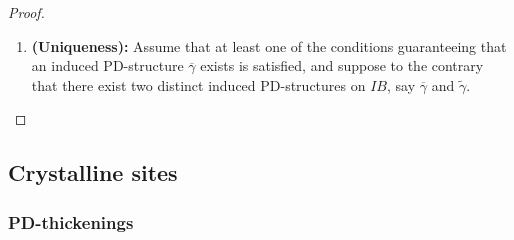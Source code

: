 \begin{proof}
\begin{enumerate}
\begin{enumerate}
                                \end{enumerate}
                            \item \textbf{(Uniqueness):} Assume that at least one of the conditions guaranteeing that an induced PD-structure $\overline{\gamma}$ exists is satisfied, and suppose to the contrary that there exist two distinct induced PD-structures on $IB$, say $\overline{\gamma}$ and $\tilde{\gamma}$.
                        \end{enumerate}
                    \end{proof}
                    
        \subsection{Crystalline sites}
            \subsubsection{PD-thickenings}
